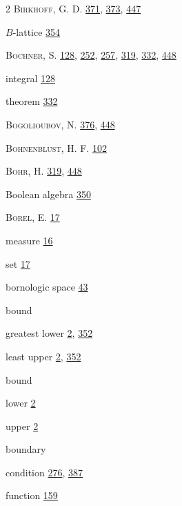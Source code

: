 \begin{multicols}{2}
\noindent \textsc{Birkhoff}, G. D. \hyperlink{page.371}{371}, \hyperlink{page.373}{373}, \hyperlink{page.447}{447}\par
\noindent $B$-lattice \hyperlink{page.354}{354}\par
\noindent \textsc{Bochner}, S. \hyperlink{page.128}{128}, \hyperlink{page.252}{252}, \hyperlink{page.257}{257}, \hyperlink{page.319}{319}, \hyperlink{page.332}{332}, \hyperlink{page.448}{448}\par
\hspace*{1.1em}integral \hyperlink{page.128}{128}\par
\hspace*{1.1em}theorem \hyperlink{page.332}{332}\par
\noindent \textsc{Bogolioubov}, N. \hyperlink{page.376}{376}, \hyperlink{page.448}{448}\par
\noindent \textsc{Bohnenblust}, H. F. \hyperlink{page.102}{102}\par
\noindent \textsc{Bohr}, H. \hyperlink{page.319}{319}, \hyperlink{page.448}{448}\par
\noindent Boolean algebra \hyperlink{page.350}{350}\par
\noindent \textsc{Borel}, E. \hyperlink{page.17}{17}\par
\hspace*{1.1em}measure \hyperlink{page.16}{16}\par
\hspace*{1.1em}set \hyperlink{page.17}{17}\par
\noindent bornologic space \hyperlink{page.43}{43}\par
\noindent bound\par
\hspace*{1.1em}greatest lower \hyperlink{page.2}{2}, \hyperlink{page.352}{352}\par
\hspace*{1.1em}least upper \hyperlink{page.2}{2}, \hyperlink{page.352}{352}\par
\noindent bound\par
\hspace*{1.1em}lower \hyperlink{page.2}{2}\par
\hspace*{1.1em}upper \hyperlink{page.2}{2}\par
\noindent boundary\par
\hspace*{1.1em}condition \hyperlink{page.276}{276}, \hyperlink{page.387}{387}\par
\hspace*{1.1em}function \hyperlink{page.159}{159}\par

\end{multicols}
